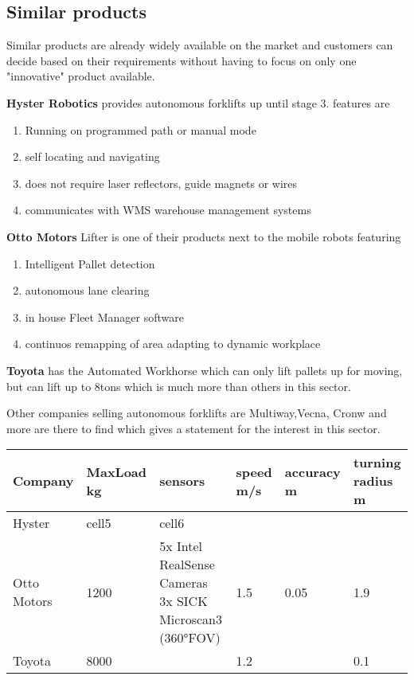 \documentclass[../report.tex]{subfiles}
\begin{document}
\subsection{Similar products}
Similar products are already widely available on the market and customers can decide based on their requirements
without having to focus on only one "innovative" product available.

\textbf{Hyster Robotics} provides autonomous forklifts up until stage 3.
features are 
\begin{enumerate}
    \item Running on programmed path or manual mode
    \item self locating and navigating
    \item does not require laser reflectors, guide magnets or wires
    \item communicates with WMS warehouse management systems 
\end{enumerate}

\textbf{Otto Motors} Lifter is one of their products next to the mobile robots featuring
\begin{enumerate}
    \item Intelligent Pallet detection
    \item autonomous lane clearing
    \item in house Fleet Manager software
    \item continuos remapping of area adapting to dynamic workplace
\end{enumerate}

\textbf{Toyota} has the Automated Workhorse which can only lift pallets up for moving, but 
can lift up to 8tons which is much more than others in this sector.

Other companies selling autonomous forklifts are Multiway,Vecna, Cronw and more are there to find 
which gives a statement for the interest in this sector. 

\begin{tabular}{ || p{2cm} || p{2cm} | p{3cm} | p{2cm} | p{2cm} | p{2cm} | } 
    \hline
    Company& MaxLoad kg & sensors & speed m/s & accuracy m & turning radius m \\ 
    \hline
    \hline
    Hyster & cell5 & cell6 & & & \\ 
    \hline
    Otto Motors & 1200 & 5x Intel RealSense Cameras 3x SICK Microscan3 (360°FOV)& 1.5 & 0.05 & 1.9\\ 
    \hline
    Toyota & 8000 & & 1.2 & &0.1\\
    \hline
  \end{tabular}
\end{document}
